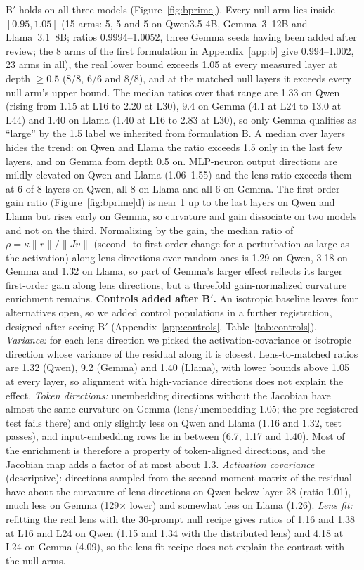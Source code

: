 \documentclass[10pt]{article}
\newcommand{\figref}[1]{Figure~\ref{#1}}
\begin{document}
B$'$ holds on all three models (\figref{fig:bprime}). Every null arm lies inside $[0.95,1.05]$ (15 arms: 5, 5 and 5 on Qwen3.5-4B, Gemma~3~12B and Llama~3.1~8B; ratios 0.9994--1.0052, three Gemma seeds having been added after review; the 8 arms of the first formulation in Appendix~\ref{app:b} give 0.994--1.002, 23 arms in all), the real lower bound exceeds 1.05 at every measured layer at depth $\ge0.5$ (8/8, 6/6 and 8/8), and at the matched null layers it exceeds every null arm's upper bound. The median ratios over that range are 1.33 on Qwen (rising from 1.15 at L16 to 2.20 at L30), 9.4 on Gemma (4.1 at L24 to 13.0 at L44) and 1.40 on Llama (1.40 at L16 to 2.83 at L30), so only Gemma qualifies as ``large'' by the 1.5 label we inherited from formulation B. A median over layers hides the trend: on Qwen and Llama the ratio exceeds 1.5 only in the last few layers, and on Gemma from depth 0.5 on. MLP-neuron output directions are mildly elevated on Qwen and Llama (1.06--1.55) and the lens ratio exceeds them at 6 of 8 layers on Qwen, all 8 on Llama and all 6 on Gemma. The first-order gain ratio (\figref{fig:bprime}d) is near 1 up to the last layers on Qwen and Llama but rises early on Gemma, so curvature and gain dissociate on two models and not on the third. Normalizing by the gain, the median ratio of $\rho=\kappa\|r\|/\|Jv\|$ (second- to first-order change for a perturbation as large as the activation) along lens directions over random ones is 1.29 on Qwen, 3.18 on Gemma and 1.32 on Llama, so part of Gemma's larger effect reflects its larger first-order gain along lens directions, but a threefold gain-normalized curvature enrichment remains.
\textbf{Controls added after B$'$.} An isotropic baseline leaves four alternatives open, so we added control populations in a further registration, designed after seeing B$'$ (Appendix~\ref{app:controls}, Table~\ref{tab:controls}). \emph{Variance:} for each lens direction we picked the activation-covariance or isotropic direction whose variance of the residual along it is closest. Lens-to-matched ratios are 1.32 (Qwen), 9.2 (Gemma) and 1.40 (Llama), with lower bounds above 1.05 at every layer, so alignment with high-variance directions does not explain the effect. \emph{Token directions:} unembedding directions without the Jacobian have almost the same curvature on Gemma (lens/unembedding 1.05; the pre-registered test fails there) and only slightly less on Qwen and Llama (1.16 and 1.32, test passes), and input-embedding rows lie in between (6.7, 1.17 and 1.40). Most of the enrichment is therefore a property of token-aligned directions, and the Jacobian map adds a factor of at most about 1.3. \emph{Activation covariance} (descriptive): directions sampled from the second-moment matrix of the residual have about the curvature of lens directions on Qwen below layer 28 (ratio 1.01), much less on Gemma (129$\times$ lower) and somewhat less on Llama (1.26). \emph{Lens fit:} refitting the real lens with the 30-prompt null recipe gives ratios of 1.16 and 1.38 at L16 and L24 on Qwen (1.15 and 1.34 with the distributed lens) and 4.18 at L24 on Gemma (4.09), so the lens-fit recipe does not explain the contrast with the null arms.
\end{document}
